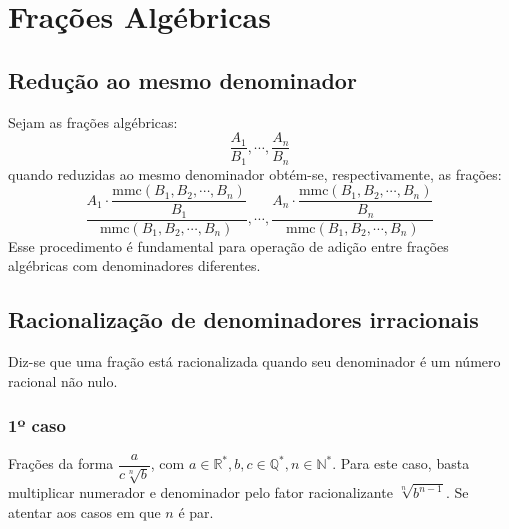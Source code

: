 \documentclass{article}
\begin{document}
\section{Frações Algébricas}
\subsection{Redução ao mesmo denominador}
Sejam as frações algébricas:
\begin{equation*}
    \dfrac{A_1}{B_1},\cdots,\dfrac{A_n}{B_n}
\end{equation*}
quando reduzidas ao mesmo denominador obtém-se, respectivamente, as frações:
\begin{equation*}
    \dfrac{A_1\cdot\dfrac{\text{mmc}(B_1,B_2,\cdots,B_n)}{B_1}}{\text{mmc}(B_1,B_2,\cdots,B_n)}, \cdots,\dfrac{A_n\cdot\dfrac{\text{mmc}(B_1,B_2,\cdots,B_n)}{B_n}}{\text{mmc}(B_1,B_2,\cdots,B_n)}
\end{equation*}
\indent Esse procedimento é fundamental para operação de adição entre frações algébricas com denominadores diferentes.

\subsection{Racionalização de denominadores irracionais}
Diz-se que uma fração está racionalizada quando seu denominador é um número racional não nulo.

\subsubsection{1º caso}
Frações da forma $\dfrac{a}{c\sqrt[n]{b}}$, com $a\in\mathbb{R^*},b,c\in\mathbb{Q^*},n\in\mathbb{N^*}$. Para este caso, basta multiplicar numerador e denominador pelo fator racionalizante $\sqrt[n]{b^{n-1}}$. Se atentar aos casos em que $n$ é par.
\end{document}
